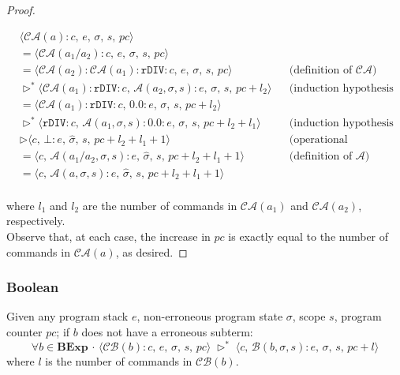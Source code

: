 \documentclass{article}
\begin{document}
\begin{proof}
\begin{itemize}
\begin{itemize}
            \[
              \begin{aligned}
                &\langle  \mathcal{CA}(a) : c,\, e,\, \sigma,\, s,\, pc \rangle \\
                &= \langle \mathcal{CA}(a_1 / a_2) : c,\, e,\, \sigma,\, s,\, pc \rangle \\
                &= \langle \mathcal{CA}(a_2) : \mathcal{CA}(a_1) : \texttt{rDIV} :  c,\, e,\, \sigma,\, s,\, pc \rangle 
                && \text{(definition of } \mathcal{CA}\text{)} \\
                &\triangleright^{\ast} \langle \mathcal{CA}(a_1) : \texttt{rDIV} :  c,\, \mathcal{A}(a_2, \sigma, s) : e,\, \sigma,\, s,\, pc + l_2 \rangle 
                && \text{(induction hypothesis 2)} \\
                &= \langle \mathcal{CA}(a_1) : \texttt{rDIV} :  c,\, 0.0 : e,\, \sigma,\, s,\, pc + l_2 \rangle \\
                &\triangleright^{\ast} \langle \texttt{rDIV} :  c,\, \mathcal{A}(a_1, \sigma, s) : 0.0 : e,\, \sigma,\, s,\, pc + l_2 + l_1 \rangle
                && \text{(induction hypothesis 1)} \\
                &\triangleright \langle c,\, \bot : e,\, \hat{\sigma},\, s,\, pc + l_2 + l_1 + 1 \rangle 
                && \text{(operational semantics)} \\
                &= \langle c,\, \mathcal{A}(a_1 / a_2, \sigma, s) : e,\, \hat{\sigma},\, s,\, pc + l_2 + l_1 + 1 \rangle
                && \text{(definition of } \mathcal{A}\text{)} \\
                &= \langle c,\, \mathcal{A}(a, \sigma, s) : e,\, \hat{\sigma},\, s,\, pc + l_2 + l_1 + 1 \rangle \\
              \end{aligned}
          \]
            
        \end{itemize}    
\end{itemize}

where $l_1$ and $l_2$ are the number of commands in $\mathcal{CA}(a_1)$ and $\mathcal{CA}(a_2)$, respectively.\\
Observe that, at each case, the increase in $pc$ is exactly equal to the number of commands in $\mathcal{CA}(a)$, as desired.

\end{proof}

\subsubsection{Boolean}
Given any program stack $e$, non-erroneous program state $\sigma$, scope $s$, program counter $pc$; if $b$ does not have a erroneous subterm:
\[
\forall b \in \textbf{BExp} \,\cdot\, \langle \mathcal{CB}(b) : c,\, e,\, \sigma,\, s,\, pc \rangle \; \triangleright^{\ast} \;
\langle c,\, \mathcal{B}(b, \sigma, s) : e,\, \sigma,\, s,\, pc + l \rangle
\] where $l$ is the number of commands in $\mathcal{CB}(b)$.
\end{document}
